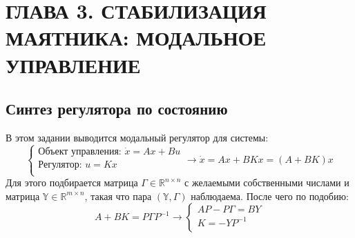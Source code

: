 \section{ГЛАВА 3. СТАБИЛИЗАЦИЯ МАЯТНИКА: МОДАЛЬНОЕ УПРАВЛЕНИЕ}

\subsection{Синтез регулятора по состоянию}
В этом задании выводится модальный регулятор для системы:
\[
        \begin{cases}
                \text{Объект управления: }\dot{x} = A x + Bu \\
                \text{Регулятор: }u = K x \\
        \end{cases} \rightarrow
        \dot{x} = A x + BKx = (A+BK)x
\]
Для этого подбирается матрица \(\Gamma \in \mathds{R}^{n \times n}\) с желаемыми собственными числами и матрица \(\mathds{Y} \in \mathds{R}^{m \times n}\), такая что пара \((\mathds{Y}, \Gamma)\) наблюдаема. После чего по подобию:
\[A+BK = P \Gamma P^{-1} \rightarrow
        \begin{cases}
                AP - P\Gamma = BY \\
                K = -YP^{-1} \\
        \end{cases}
\]

\FloatBarrier